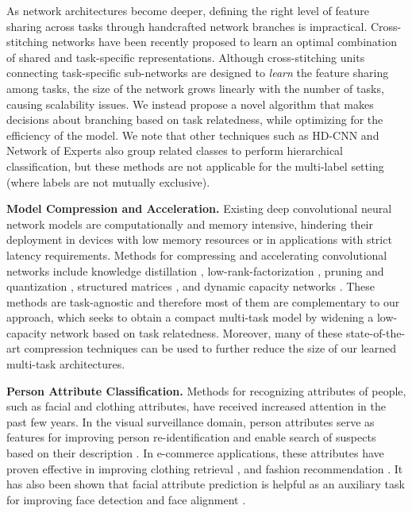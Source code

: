 \documentclass[10pt,twocolumn,letterpaper]{article}
\begin{document}
As network architectures become deeper, defining the right level of feature sharing across tasks through handcrafted network branches is impractical. Cross-stitching networks \cite{Misra16} have been recently proposed to learn an optimal combination of shared and task-specific representations. Although cross-stitching units connecting task-specific sub-networks are designed to \emph{learn} the  feature sharing among tasks, 
the size of the network grows linearly with the number of tasks, causing scalability issues. We instead propose a novel algorithm that makes decisions about branching  based on task relatedness, while optimizing for the efficiency of the model. We note that other techniques such as HD-CNN \cite{HDCNN15} and Network of Experts \cite{ahmed2016network} also group related classes to perform hierarchical classification, but these methods are not applicable for the multi-label setting (where labels are not mutually exclusive).

{\bf Model Compression and Acceleration.} Existing deep convolutional neural network models are computationally and memory intensive, hindering their deployment in devices with low memory resources or in applications with strict latency requirements.  Methods for compressing and accelerating convolutional networks include knowledge distillation \cite{Hinton15,romero2014fitnets}, low-rank-factorization \cite{ioannou2015training,tai2015convolutional,sainath2013low}, pruning and quantization \cite{han2015deep,polyak2015channel}, structured matrices \cite{Circulant15,sindhwani2015structured,gong2016tamp}, and dynamic capacity networks \cite{almahairi2015dynamic}. These methods are task-agnostic and therefore most of them are complementary to our approach, which seeks to obtain a compact multi-task model by widening a low-capacity network based on task relatedness. 
Moreover, many of these state-of-the-art compression techniques can be used to further reduce the size of our learned multi-task architectures. 

{\bf Person Attribute Classification.} Methods for recognizing attributes of people, such as facial and clothing attributes, have received increased attention in the past few years. In the visual surveillance domain, person attributes serve as features for improving person re-identification \cite{su2016deep} and enable search of suspects based on their description \cite{vaquero2009attribute,feris2014attribute}. In e-commerce applications, these attributes have proven effective in improving clothing retrieval \cite{huang2015cross}, and fashion recommendation \cite{liu2014wow}. It has also been shown that facial attribute prediction is helpful as an auxiliary task for improving face detection \cite{yang2015facial} and face alignment \cite{zhang2016learning}.
\end{document}
